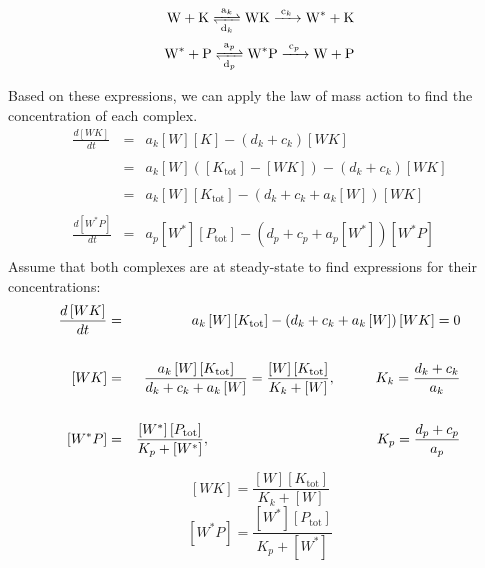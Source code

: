 \documentclass{article}
\begin{document}
\large


\begin{eqnarray*}
\ce{W + K <=>[a_k][d_k] WK ->[c_k] W^* + K }\\
\ce{W^* + P <=>[a_p][d_p] W^*P ->[c_p] W + P }
\end{eqnarray*}

Based on these expressions, we can apply the law of mass action to find the concentration of each complex.
\begin{eqnarray*}
\frac{d \left[ WK \right]}{dt} & = & a_k \left[ W \right]\left[ K \right] - \left(  d_k + c_k \right) \left[ WK \right]\\
\\
& = & a_k \left[ W \right] \left( \left[ K_{\textrm{tot}} \right] - \left[ WK \right] \right) - \left(  d_k + c_k \right) \left[ WK \right]\\
\\
& = & a_k \left[ W \right]  \left[ K_{\textrm{tot}} \right] - \left(  d_k + c_k + a_k \left[ W \right] \right) \left[ WK \right]\\
\\
\frac{d \left[ W^*P \right]}{dt} & = & a_p \left[ W^* \right]  \left[ P_{\textrm{tot}} \right] - \left(  d_p + c_p + a_p \left[ W^* \right] \right) \left[ W^*P \right]\\
\end{eqnarray*}
Assume that both complexes are at steady-state to find expressions for their concentrations:
\begin{eqnarray*}
\frac{d \left[ WK \right]}{dt}  & = & a_k \left[ W \right]  \left[ K_{\textrm{tot}} \right] - \left(  d_k + c_k + a_k \left[ W \right] \right) \left[ WK \right] = 0 \\
\\
\left[ WK \right] & = & \frac{a_k \left[ W \right]  \left[ K_{\textrm{tot}} \right]}{ d_k + c_k + a_k \left[ W \right]} = \frac{\left[ W \right]  \left[ K_{\textrm{tot}} \right]}{ K_k +  \left[ W \right]}, \hspace{1 cm} K_k = \frac{d_k + c_k}{a_k}\\
\\
\left[ W^*P \right] & = & \frac{\left[ W^* \right]  \left[ P_{\textrm{tot}} \right]}{ K_p +  \left[ W^* \right]}, \hspace{4.2 cm} K_p = \frac{d_p + c_p}{a_p}
\end{eqnarray*}

\[ \left[ WK \right] = \frac{\left[ W \right]  \left[ K_{\textrm{tot}} \right]}{ K_k +  \left[ W \right]} \]
\[ \left[ W^*P \right] = \frac{\left[ W^* \right]  \left[ P_{\textrm{tot}} \right]}{ K_p +  \left[ W^* \right]} \]
\end{document}

